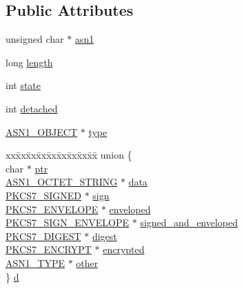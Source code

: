 \subsection*{Public Attributes}
\begin{DoxyCompactItemize}
\item 
unsigned char $\ast$ \hyperlink{structpkcs7__st_ab1fc765421d37e4483b30cf1f12123d5}{asn1}
\item 
long \hyperlink{structpkcs7__st_a565b91c0f8c20b54770879e006bd41ee}{length}
\item 
int \hyperlink{structpkcs7__st_a347c4591ec3bcf75f4dd86b430b20426}{state}
\item 
int \hyperlink{structpkcs7__st_aaefed5b8e3dc5995f7fb1e1a300b7668}{detached}
\item 
\hyperlink{asn1_8h_ae10c08e4e6b23f67a39b2add932ec48f}{A\+S\+N1\+\_\+\+O\+B\+J\+E\+CT} $\ast$ \hyperlink{structpkcs7__st_acd92bf461725525e7785077578ccf226}{type}
\item 
\begin{tabbing}
xx\=xx\=xx\=xx\=xx\=xx\=xx\=xx\=xx\=\kill
union \{\\
\>char $\ast$ \hyperlink{structpkcs7__st_a8e6f5d15d4ac99827ac77156570584ae}{ptr}\\
\>\hyperlink{ossl__typ_8h_afbd05e94e0f0430a2b729473efec88c1}{ASN1\_OCTET\_STRING} $\ast$ \hyperlink{structpkcs7__st_aa85034648deabb1e0f6edeaa2d75ee50}{data}\\
\>\hyperlink{pkcs7_8h_ae3e48838b6eec0a566e029e560b8b9d0}{PKCS7\_SIGNED} $\ast$ \hyperlink{structpkcs7__st_ad1a69f7c378d0594981d1f57be1a28c3}{sign}\\
\>\hyperlink{pkcs7_8h_a1f34be8284ff006103ac91e9c995b817}{PKCS7\_ENVELOPE} $\ast$ \hyperlink{structpkcs7__st_a05449438507cd8c8b8692839bbbfb9c3}{enveloped}\\
\>\hyperlink{pkcs7_8h_a4eb4ff15388b5f4e4d613ceb1c358267}{PKCS7\_SIGN\_ENVELOPE} $\ast$ \hyperlink{structpkcs7__st_afe69a67d002aad9fc12be3a3bc019551}{signed\_and\_enveloped}\\
\>\hyperlink{pkcs7_8h_a73ca53b37fe527bd00bb844b49a54e85}{PKCS7\_DIGEST} $\ast$ \hyperlink{structpkcs7__st_a1c5d480705bdf17b4632d8ef2031a46d}{digest}\\
\>\hyperlink{pkcs7_8h_a313da3bf0273fe0a578dffa29bc39a22}{PKCS7\_ENCRYPT} $\ast$ \hyperlink{structpkcs7__st_a790fdd3e5a07929c8b3a2d1816e77033}{encrypted}\\
\>\hyperlink{asn1_8h_a7895e03d9fee2bc4963faf2a31a9439e}{ASN1\_TYPE} $\ast$ \hyperlink{structpkcs7__st_a8e8bea8f769ecb1bfacde11f42509327}{other}\\
\} \hyperlink{structpkcs7__st_a0d40ba1a66dac4d1f19da42dec6adfd3}{d}\\

\end{tabbing}\end{DoxyCompactItemize}


